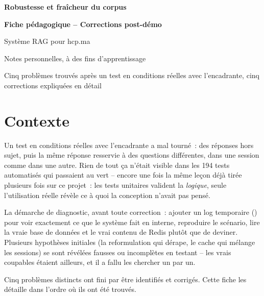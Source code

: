 \documentclass[11pt,a4paper]{article}
\newcommand{\code}[1]{\texttt{\detokenize{#1}}}
\begin{document}
\begin{titlepage}
\centering
\vspace*{2cm}
{\Huge\bfseries\color{navy} Robustesse et fra\^icheur du corpus\par}
\vspace{0.5cm}
{\Large\bfseries\color{gold} Fiche p\'edagogique -- Corrections post-d\'emo\par}
\vspace{0.3cm}
{\large\color{greytext} Syst\`eme RAG pour hcp.ma\par}
\vspace{1.5cm}
{\large\color{greytext} Notes personnelles, \`a des fins d'apprentissage\par}
\vspace{0.3cm}
{\large\color{greytext} Cinq probl\`emes trouv\'es apr\`es un test en conditions r\'eelles avec l'encadrante, cinq corrections expliqu\'ees en d\'etail\par}
\vfill
\end{titlepage}

\tableofcontents
\newpage

\section{Contexte}

Un test en conditions r\'eelles avec l'encadrante a mal tourn\'e~: des r\'eponses hors
sujet, puis la m\^eme r\'eponse resservie \`a des questions diff\'erentes, dans une
session comme dans une autre. Rien de tout \c{c}a n'\'etait visible dans les 194 tests
automatis\'es qui passaient au vert -- encore une fois la m\^eme le\c{c}on d\'ej\`a tir\'ee
plusieurs fois sur ce projet~: les tests unitaires valident la \emph{logique}, seule
l'utilisation r\'eelle r\'ev\`ele ce \`a quoi la conception n'avait pas pens\'e.

La d\'emarche de diagnostic, avant toute correction~: ajouter un log temporaire
(\code{[DEBUG reformulation]}) pour voir exactement ce que le syst\`eme fait en
interne, reproduire le sc\'enario, lire la vraie base de donn\'ees et le vrai
contenu de Redis plut\^ot que de deviner. Plusieurs hypoth\`eses initiales (la
reformulation qui d\'erape, le cache qui m\'elange les sessions) se sont r\'ev\'el\'ees
fausses ou incompl\`etes en testant -- les vrais coupables \'etaient ailleurs, et il a
fallu les chercher un par un.

Cinq probl\`emes distincts ont fini par \^etre identifi\'es et corrig\'es. Cette fiche les
d\'etaille dans l'ordre o\`u ils ont \'et\'e trouv\'es.
\end{document}
